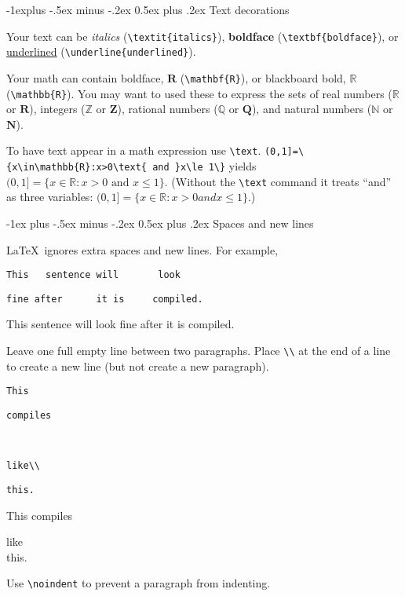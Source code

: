 \documentclass[10pt,landscape]{article}
\makeatletter
\renewcommand{\section}{\@startsection{section}{1}{0mm}%
                                {-1ex plus -.5ex minus -.2ex}%
                                {0.5ex plus .2ex}%
                                {\normalfont\large\bfseries}}
\renewcommand{\subsection}{\@startsection{subsection}{2}{0mm}%
                                {-1explus -.5ex minus -.2ex}%
                                {0.5ex plus .2ex}%
                                {\normalfont\normalsize\bfseries}}
\makeatother
\begin{document}
\begin{multicols}{3}
    \subsection{Text decorations}

    Your text can be \textit{italics} (\verb!\textit{italics}!), \textbf{boldface} (\verb!\textbf{boldface}!), or \underline{underlined} (\verb!\underline{underlined}!).

    Your math can contain boldface, $\mathbf{R}$ (\verb!\mathbf{R}!), or blackboard bold, $\mathbb{R}$ (\verb!\mathbb{R}!). You may want to used these to express the sets of real numbers ($\mathbb{R}$ or $\mathbf{R}$), integers ($\mathbb{Z}$ or $\mathbf{Z}$), rational numbers ($\mathbb{Q}$ or $\mathbf{Q}$), and natural numbers ($\mathbb{N}$ or $\mathbf{N}$).

    To have text appear in a math expression use \verb!\text!. \verb!(0,1]=\{x\in\mathbb{R}:x>0\text{ and }x\le 1\}! yields $(0,1]=\{x\in\mathbb{R}:x>0\text{ and }x\le 1\}$. (Without the \verb!\text! command it treats ``and'' as three variables: $(0,1]=\{x\in\mathbb{R}:x>0 and x\le 1\}$.)



    \section{Spaces and new lines}

    \LaTeX\ ignores extra spaces and new lines. For example,

    \verb!This   sentence will       look!

    \verb!fine after      it is     compiled.!

    This   sentence will       look
    fine after      it is     compiled.


    Leave one full empty line between two paragraphs. Place \verb!\\! at the end of a line to create a new line (but not create a new paragraph).

    \verb!This!

    \verb!compiles!

    ~

    \verb!like\\!

    \verb!this.!

    This
    compiles

    like\\
    this.

    Use  \verb!\noindent! to prevent a paragraph from indenting.


\end{multicols}
\end{document}
